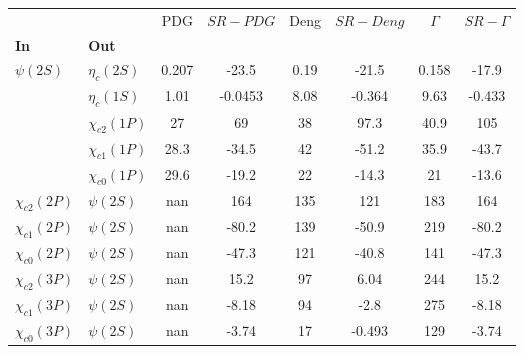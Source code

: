 \begin{tabular}{l|l|c|c|c|c|c|c}
\toprule
                &            &   PDG & $SR-PDG$ &  Deng & $SR-Deng$ &  $\Gamma$ & $SR-\Gamma$ \\
\textbf{In} & \textbf{Out} &       &          &       &           &           &             \\
\midrule
\textbf{$\psi(2S)$} & \textbf{$\eta_{c}(2S)$} & 0.207 &    -23.5 &  0.19 &     -21.5 &     0.158 &       -17.9 \\
                & \textbf{$\eta_{c}(1S)$} &  1.01 &  -0.0453 &  8.08 &    -0.364 &      9.63 &      -0.433 \\
                & \textbf{$\chi_{c2}(1P)$} &    27 &       69 &    38 &      97.3 &      40.9 &         105 \\
                & \textbf{$\chi_{c1}(1P)$} &  28.3 &    -34.5 &    42 &     -51.2 &      35.9 &       -43.7 \\
                & \textbf{$\chi_{c0}(1P)$} &  29.6 &    -19.2 &    22 &     -14.3 &        21 &       -13.6 \\
\textbf{$\chi_{c2}(2P)$} & \textbf{$\psi(2S)$} &   nan &      164 &   135 &       121 &       183 &         164 \\
\textbf{$\chi_{c1}(2P)$} & \textbf{$\psi(2S)$} &   nan &    -80.2 &   139 &     -50.9 &       219 &       -80.2 \\
\textbf{$\chi_{c0}(2P)$} & \textbf{$\psi(2S)$} &   nan &    -47.3 &   121 &     -40.8 &       141 &       -47.3 \\
\textbf{$\chi_{c2}(3P)$} & \textbf{$\psi(2S)$} &   nan &     15.2 &    97 &      6.04 &       244 &        15.2 \\
\textbf{$\chi_{c1}(3P)$} & \textbf{$\psi(2S)$} &   nan &    -8.18 &    94 &      -2.8 &       275 &       -8.18 \\
\textbf{$\chi_{c0}(3P)$} & \textbf{$\psi(2S)$} &   nan &    -3.74 &    17 &    -0.493 &       129 &       -3.74 \\
\bottomrule
\end{tabular}
